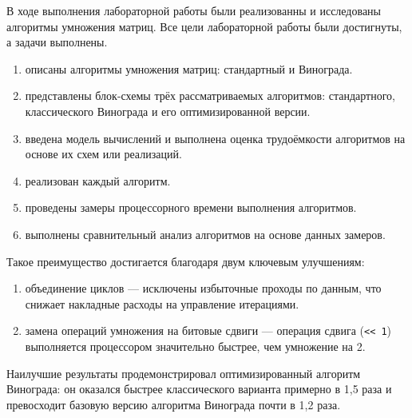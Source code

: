 
В ходе выполнения лабораторной работы были реализованны и исследованы алгоритмы умножения матриц. Все цели лабораторной работы были достигнуты, а задачи выполнены.
\begin{enumerate}
	\item описаны алгоритмы умножения матриц: стандартный и Винограда.
	\item представлены блок-схемы трёх рассматриваемых алгоритмов: стандартного, классического Винограда и его оптимизированной версии.
	\item введена модель вычислений и выполнена оценка трудоёмкости алгоритмов на основе их схем или реализаций.
	\item реализован каждый алгоритм.
	\item проведены замеры процессорного времени выполнения алгоритмов.
	\item выполнены сравнительный анализ алгоритмов на основе данных замеров.
\end{enumerate}



Такое преимущество достигается благодаря двум ключевым улучшениям:
\begin{enumerate}
	\item объединение циклов --- исключены избыточные проходы по данным, что снижает накладные расходы на управление итерациями.
	\item замена операций умножения на битовые сдвиги --- операция сдвига (\lstinline{<< 1}) выполняется процессором значительно быстрее, чем умножение на 2.
\end{enumerate}



Наилучшие результаты продемонстрировал оптимизированный алгоритм Винограда: он оказался быстрее классического варианта примерно в 1,5 раза и превосходит базовую версию алгоритма Винограда почти в 1,2 раза.
